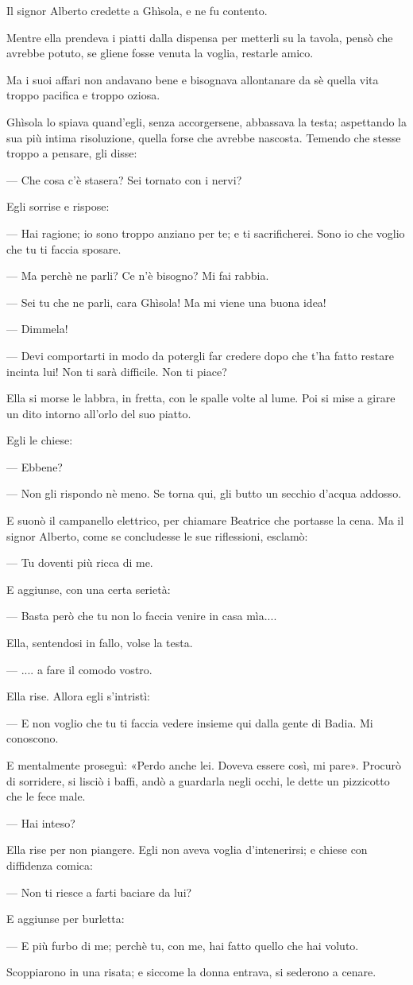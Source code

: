 Il signor Alberto credette a Ghìsola, e ne fu contento.

Mentre ella prendeva i piatti dalla dispensa per metterli su la tavola, pensò che avrebbe potuto, se gliene fosse venuta la voglia, restarle amico.

Ma i suoi affari non andavano bene e bisognava allontanare da sè quella vita troppo pacifica e troppo oziosa.

Ghìsola lo spiava quand’egli, senza accorgersene, abbassava la testa; aspettando la sua più intima risoluzione, quella forse che avrebbe nascosta. Temendo che stesse troppo a pensare, gli disse:

— Che cosa c’è stasera? Sei tornato con i nervi?

Egli sorrise e rispose:

— Hai ragione; io sono troppo anziano per te; e ti sacrificherei. Sono io che voglio che tu ti faccia sposare.

— Ma perchè ne parli? Ce n’è bisogno? Mi fai rabbia.

— Sei tu che ne parli, cara Ghìsola! Ma mi viene una buona idea!

— Dimmela!

— Devi comportarti in modo da potergli far credere dopo che t’ha fatto restare incinta lui! Non ti sarà difficile. Non ti piace?

Ella si morse le labbra, in fretta, con le spalle volte al lume. Poi si mise a girare un dito intorno all’orlo del suo piatto.

Egli le chiese:

— Ebbene?

— Non gli rispondo nè meno. Se torna qui, gli butto un secchio d’acqua addosso.

E suonò il campanello elettrico, per chiamare Beatrice che portasse la cena. Ma il signor Alberto, come se concludesse le sue riflessioni, esclamò:

— Tu doventi più ricca di me.

E aggiunse, con una certa serietà:

— Basta però che tu non lo faccia venire in casa mìa....

Ella, sentendosi in fallo, volse la testa.

— .... a fare il comodo vostro.

Ella rise. Allora egli s’intristì:

— E non voglio che tu ti faccia vedere insieme qui dalla gente di Badia. Mi conoscono.

E mentalmente proseguì: «Perdo anche lei. Doveva essere così, mi pare». Procurò di sorridere, si lisciò i baffi, andò a guardarla negli occhi, le dette un pizzicotto che le fece male.

— Hai inteso?

Ella rise per non piangere. Egli non aveva voglia d’intenerirsi; e chiese con diffidenza comica:

— Non ti riesce a farti baciare da lui?

E aggiunse per burletta:

— E più furbo di me; perchè tu, con me, hai fatto quello che hai voluto.

Scoppiarono in una risata; e siccome la donna entrava, si sederono a cenare.
